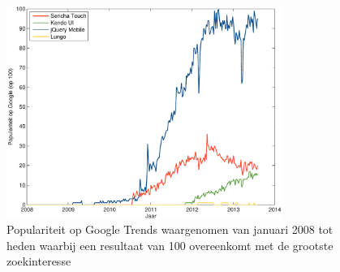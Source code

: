 \begin{figure}
  \centering
  \includegraphics[width=0.8\textwidth]{figuren/google-trends.pdf}
  \caption{Populariteit op Google Trends waargenomen van januari 2008 tot heden waarbij een resultaat van 100 overeenkomt met de grootste zoekinteresse~\cite{Google2012a}}
  \label{fig:google-trends}
\end{figure}